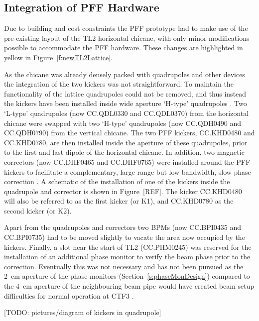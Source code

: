 \subsection{Integration of PFF Hardware}
\label{ss:tl2PFFIntegration}

Due to building and cost constraints the PFF prototype had to make use of the pre-existing layout of the TL2 horizontal chicane, with only minor modifications possible to accommodate the PFF hardware. These changes are highlighted in yellow in Figure~\ref{f:newTL2Lattice}.

As the chicane was already densely packed with quadrupoles and other devices the integration of the two kickers was not straightforward. To maintain the functionality of the lattice quadrupoles could not be removed, and thus instead the kickers have been installed inside wide aperture `H-type' quadrupoles \cite{tl2Magnets}. Two `L-type'  quadrupoles \cite{tl2Magnets} (now CC.QDL0330 and CC.QDL0370) from the horizontal chicane were swapped with two `H-type' quadrupoles (now CC.QDH0490 and CC.QDH0790) from the vertical chicane. The two PFF kickers, CC.KHD0480 and CC.KHD0780, are then installed inside the aperture of these quadrupoles, prior to the first and last dipole of the horizontal chicane. In addition, two magnetic correctors (now CC.DHF0465 and CC.DHF0765) were installed around the PFF kickers to facilitate a complementary, large range but low bandwidth, slow phase correction \cite{jackLCWS14}. A schematic of the installation of one of the kickers inside the quadrupole and corrector is shown in Figure~[REF]. The kicker CC.KHD0480 will also be referred to as the first kicker (or K1), and CC.KHD0780 as the second kicker (or K2).

Apart from the quadrupoles and correctors two BPMs (now CC.BPI0435 and CC.BPI0735) had to be moved slightly to vacate the area now occupied by the kickers. Finally, a slot near the start of TL2 (CC.PHM0245) was reserved for the installation of an additional phase monitor to verify the beam phase prior to the correction. Eventually this was not necessary and has not been pursued as the 2~cm aperture of the phase monitors (Section~\ref{s:phaseMonDesign}) compared to the 4~cm aperture of the neighbouring beam pipe would have created beam setup difficulties for normal operation at CTF3 \cite{piotrPriv}.

[TODO: pictures/diagram of kickers in quadrupole]


